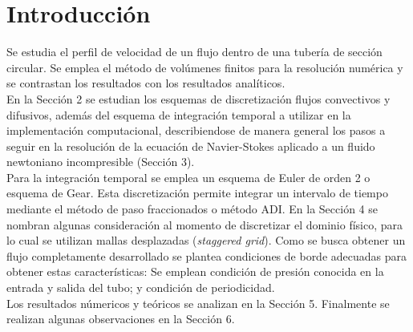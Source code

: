 \section{Introducción}

Se estudia el perfil de velocidad de un flujo dentro de una tubería de sección circular. Se emplea el método de volúmenes finitos para la resolución numérica y se contrastan los resultados con los resultados analíticos. \\

En la Sección 2 se estudian los esquemas de discretización flujos convectivos y difusivos, además del esquema de integración temporal a utilizar en la implementación computacional, describiendose de manera general los pasos a seguir en la resolución de la ecuación de Navier-Stokes aplicado a un fluido newtoniano incompresible (Sección 3).\\

Para la integración temporal se emplea un esquema de Euler de orden 2 o esquema de Gear. Esta discretización permite integrar un intervalo de tiempo mediante el método de paso fraccionados o método ADI. En la Sección 4 se nombran algunas consideración al momento de discretizar el dominio físico, para lo cual se utilizan mallas desplazadas (\textit{staggered grid}).  Como se busca obtener un flujo completamente desarrollado se plantea condiciones de borde adecuadas para obtener estas características: Se emplean condición de presión conocida en la entrada y salida del tubo; y condición de periodicidad.\\

Los resultados númericos y teóricos se analizan en la Sección 5. Finalmente se realizan algunas observaciones en la Sección 6.


